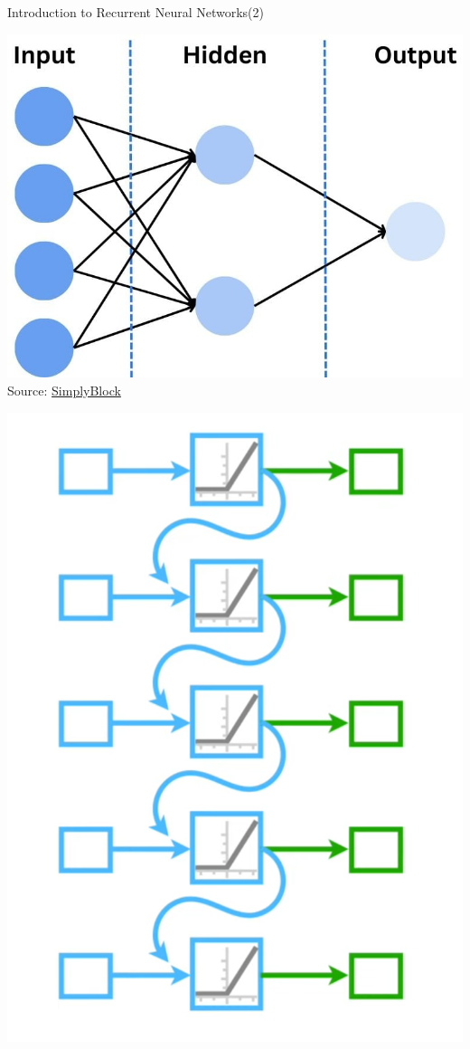 \documentclass{beamer}
\begin{document}
\begin{frame}{Introduction to Recurrent Neural Networks(2)}

\centering
\begin{minipage}{0.48\linewidth}
    \centering
    \includegraphics[width=\linewidth]{classical-neural-network.jpg}
    \label{fig:cnn}
    {\tiny Source: \href{https://www.simplyblock.io/blog/image-recognition-with-neural-networks/}{SimplyBlock}}
\end{minipage}
\hfill
\begin{minipage}{0.48\linewidth}
    \centering
    \includegraphics[width=\linewidth]{RNN.png}

\end{minipage}
\end{frame}
\end{document}
